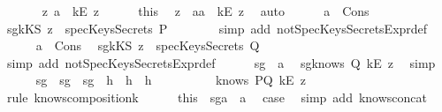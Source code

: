 \begin{isabellebody}
\ \ \ \ \isamarkupfalse%
\ {\isachardoublequoteopen}{\isasymexists}\ z{}{\isachardot}\ a\ {\isacharequal}\ {\isacharparenleft}kE\ z{}{\isacharparenright}{\isachardoublequoteclose}\isanewline
\ \ \ \ \isamarkupfalse%
\ this\ \isamarkupfalse%
\ z\ \ a{}{\isacharcolon}{\isachardoublequoteopen}a\ {\isacharequal}\ {\isacharparenleft}kE\ z{\isacharparenright}{\isachardoublequoteclose}\ \isamarkupfalse%
\ auto\isanewline
\ \ \ \ \isamarkupfalse%
\ a{}\ \ Cons\ \isamarkupfalse%
\ sg{}{\isacharcolon}{\isachardoublequoteopen}{\isacharparenleft}kKS\ z{\isacharparenright}\ {\isasymnotin}\ specKeysSecrets\ P{\isachardoublequoteclose}\isanewline
\ \ \ \ \ \ \isamarkupfalse%
\ {\isacharparenleft}simp\ add{\isacharcolon}\ notSpecKeysSecretsExpr{\isacharunderscore}def{\isacharparenright}\isanewline
\ \ \ \ \isamarkupfalse%
\ a{}\ \ Cons\ \isamarkupfalse%
\ sg{}{\isacharcolon}{\isachardoublequoteopen}{\isacharparenleft}kKS\ z{\isacharparenright}\ {\isasymnotin}\ specKeysSecrets\ Q{\isachardoublequoteclose}\isanewline
\ \ \ \ \ \ \isamarkupfalse%
\ {\isacharparenleft}simp\ add{\isacharcolon}\ notSpecKeysSecretsExpr{\isacharunderscore}def{\isacharparenright}\isanewline
\ \ \ \ \isamarkupfalse%
\ sg{}\ \ a{}\ \isamarkupfalse%
\ sg{}{\isacharcolon}{\isachardoublequoteopen}knows\ Q\ {\isacharbrackleft}kE\ z{\isacharbrackright}{\isachardoublequoteclose}\ \isamarkupfalse%
\ simp\isanewline
\ \ \ \ \isamarkupfalse%
\ sg{}\ \ sg{}\ \ sg{}\ \ h{}\ \ h{}\ \ h{}\ \ \isanewline
\ \ \ \ \ \ \isamarkupfalse%
\ {\isachardoublequoteopen}knows\ PQ\ {\isacharbrackleft}kE\ z{\isacharbrackright}{\isachardoublequoteclose}\ \isanewline
\ \ \ \ \ \ \isamarkupfalse%
\ {\isacharparenleft}rule\ knows{\isacharunderscore}composition{}{\isacharunderscore}k{\isacharparenright}\isanewline
\ \ \ \ \isamarkupfalse%
\ this\ \ sg{}a\ \ a{}\ \isamarkupfalse%
\ {\isacharquery}case\ \isamarkupfalse%
\ {\isacharparenleft}simp\ add{\isacharcolon}\ knows{\isacharunderscore}concat{\isacharunderscore}{}{\isacharparenright}\isanewline

\end{isabellebody}
